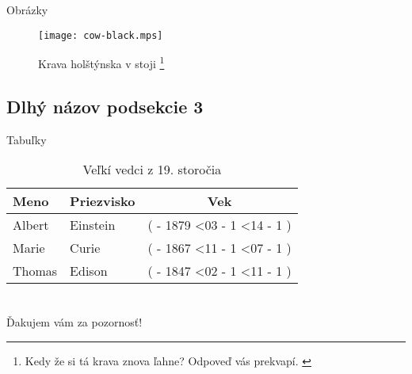 \documentclass[
]{beamer}
\begin{document}
\begin{frame}{Obrázky}
\begin{figure}
  \texttt{[image: cow-black.mps]}
  \caption{Krava holštýnska v stoji%
    \footnote{%
      Kedy že si tá krava znova ľahne?
      Odpoveď vás prekvapí.
      \cite{tolkamp10cows}
    }%
  }
\end{figure}
\end{frame}

\subsection[Názov podsekcie 3]{Dlhý názov podsekcie 3}

\def\age(#1-#2-#3){%
  \the\numexpr(
    \year - #1
    \ifnum\month<#2
      - 1
    \else
      \ifnum\month=#2
        \ifnum\day<#3
          - 1
        \fi
      \fi
    \fi
  )%
}

\begin{frame}{Tabuľky}
\begin{table}
  \begin{tabular}{llc}
    Meno & Priezvisko & Vek \\ \midrule
    Albert & Einstein & \age(1879-03-14) \\
    Marie & Curie & \age(1867-11-07) \\
    Thomas & Edison & \age(1847-02-11) \\
  \end{tabular}
  \caption{Veľkí vedci z 19. storočia}
\end{table}
\end{frame}

\section{\bibname}
\begin{frame}[t, allowframebreaks]{\bibname}
\printbibliography[heading=none]
\end{frame}

\begin{frame}[plain]
\vfill
\centerline{Ďakujem vám za pozornosť!}
\vfill\vfill
\end{frame}
\end{document}
